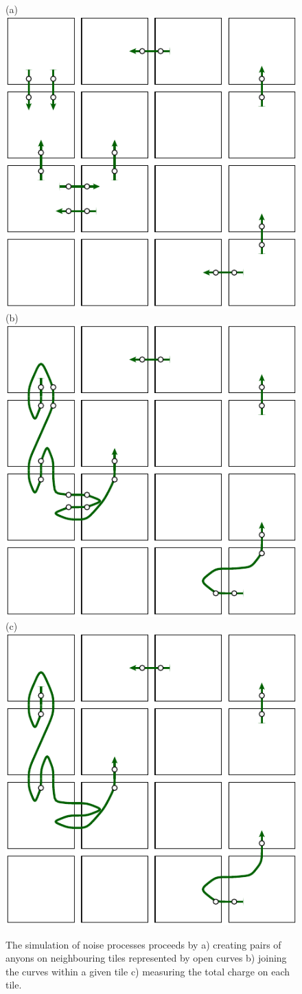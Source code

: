 \documentclass[aps, prl, letterpaper, twocolumn, superscriptaddress, notitlepage, 10pt]{revtex4-1}
\begin{document}
\begin{figure}[th!]
\begin{center}
	{\scriptsize (a)
	\includegraphics[width=0.57\columnwidth]{pair-create.pdf}
	\hskip 4pt
	(b)
	\includegraphics[width=0.57\columnwidth]{syndrome-1.pdf}
	\hskip 4pt
	(c)}
	\includegraphics[width=0.57\columnwidth]{syndrome-2.pdf}
\caption{The simulation of noise processes proceeds by a) creating pairs of anyons on 
neighbouring tiles represented by open curves b) joining the curves within a given tile 
c) measuring the total charge on each tile.}
\label{f:simex}
\end{center}
\end{figure}
\end{document}
